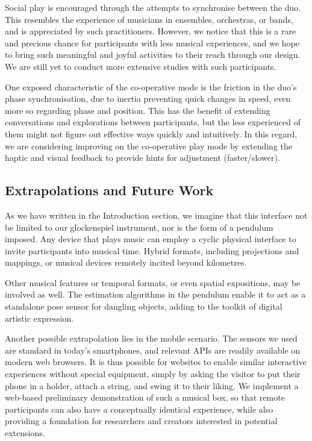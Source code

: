 \documentclass[manuscript,review]{acmart}
\begin{document}
Social play is encouraged through the attempts to synchronise between the duo. This resembles the experience of musicians in ensembles, orchestras, or bands, and is appreciated by such practitioners. However, we notice that this is a rare and precious chance for participants with less musical experiences, and we hope to bring such meaningful and joyful activities to their reach through our design. We are still yet to conduct more extensive studies with such participants.

One exposed characteristic of the co-operative mode is the friction in the duo's phase synchronisation, due to inertia preventing quick changes in speed, even more so regarding phase and position. This has the benefit of extending conversations and explorations between participants, but the less experienced of them might not figure out effective ways quickly and intuitively. In this regard, we are considering improving on the co-operative play mode by extending the haptic and visual feedback to provide hints for adjustment (faster/slower).

\subsection{Extrapolations and Future Work}
As we have written in the Introduction section, we imagine that this interface not be limited to our glockenspiel instrument, nor is the form of a pendulum imposed. Any device that plays music can employ a cyclic physical interface to invite participants into musical time. Hybrid formats, including projections and mappings, or musical devices remotely incited beyond kilometres.

Other musical features or temporal formats, or even spatial expositions, may be involved as well. The estimation algorithms in the pendulum enable it to act as a standalone pose sensor for dangling objects, adding to the toolkit of digital artistic expression.

Another possible extrapolation lies in the mobile scenario. The sensors we used are standard in today's smartphones, and relevant APIs are readily available on modern web browsers. It is thus possible for websites to enable similar interactive experiences without special equipment, simply by asking the visitor to put their phone in a holder, attach a string, and swing it to their liking. We implement a web-based preliminary demonstration of such a musical box, so that remote participants can also have a conceptually identical experience, while also providing a foundation for researchers and creators interested in potential extensions.
\end{document}
